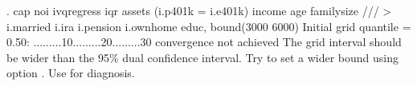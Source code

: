 . cap noi ivqregress iqr assets (i.p401k = i.e401k) income age familysize  ///
>         i.married i.ira i.pension i.ownhome educ, bound(3000 6000)
{\smallskip}
Initial grid
    quantile = 0.50: .........10.........20.........30
{\smallskip}
convergence not achieved
    The grid interval should be wider than the 95\% dual confidence interval.
    Try to set a wider bound using option {}. Use {} for
    diagnosis.
